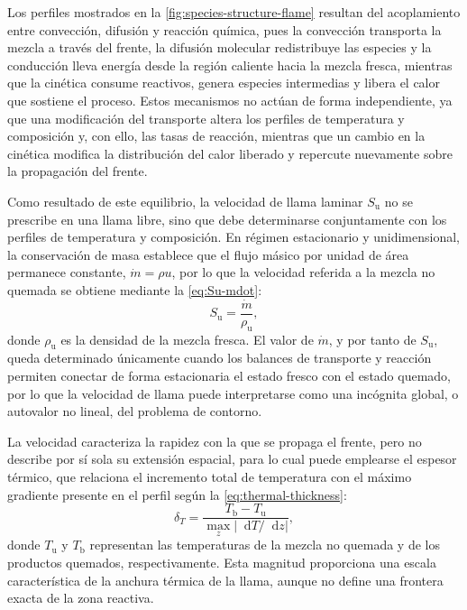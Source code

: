 \documentclass[12pt,a4paper,twoside,openany]{book}
\newcommand{\dd}{\mathop{}\!\mathrm{d}}
\newcommand{\abs}[1]{\left\lvert #1\right\rvert}
\newcommand{\Su}{S_{\mathrm{u}}}
\begin{document}
Los perfiles mostrados en la \cref{fig:species-structure-flame} resultan del
acoplamiento entre convección, difusión y reacción química, pues la convección
transporta la mezcla a través del frente, la difusión molecular redistribuye las
especies y la conducción lleva energía desde la región caliente hacia la mezcla
fresca, mientras que la cinética consume reactivos, genera especies intermedias
y libera el calor que sostiene el proceso. Estos mecanismos no actúan de forma
independiente, ya que una modificación del transporte altera los perfiles de
temperatura y composición y, con ello, las tasas de reacción, mientras que un
cambio en la cinética modifica la distribución del calor liberado y repercute
nuevamente sobre la propagación del frente.

Como resultado de este equilibrio, la velocidad de llama laminar \(\Su\) no se
prescribe en una llama libre, sino que debe determinarse conjuntamente con los
perfiles de temperatura y composición. En régimen estacionario y
unidimensional, la conservación de masa establece que el flujo másico por
unidad de área permanece constante, \(\dot m=\rho u\), por lo que la velocidad
referida a la mezcla no quemada se obtiene mediante la
\cref{eq:Su-mdot}:
\begin{equation}
  \Su=\frac{\dot m}{\rho_{\mathrm u}},
  \label{eq:Su-mdot}
\end{equation}
donde \(\rho_{\mathrm u}\) es la densidad de la mezcla fresca. El valor de
\(\dot m\), y por tanto de \(\Su\), queda determinado únicamente cuando los
balances de transporte y reacción permiten conectar de forma estacionaria el
estado fresco con el estado quemado, por lo que la velocidad de llama puede
interpretarse como una incógnita global, o autovalor no lineal, del problema de
contorno.

La velocidad caracteriza la rapidez con la que se propaga el frente, pero no
describe por sí sola su extensión espacial, para lo cual puede emplearse el
espesor térmico, que relaciona el incremento total de temperatura con el máximo
gradiente presente en el perfil según la
\cref{eq:thermal-thickness}:
\begin{equation}
  \delta_T=
  \frac{T_{\mathrm b}-T_{\mathrm u}}
       {\displaystyle\max_z\abs{\dd T/\dd z}},
  \label{eq:thermal-thickness}
\end{equation}
donde \(T_{\mathrm u}\) y \(T_{\mathrm b}\) representan las temperaturas de la
mezcla no quemada y de los productos quemados, respectivamente. Esta magnitud
proporciona una escala característica de la anchura térmica de la llama, aunque
no define una frontera exacta de la zona reactiva.
\end{document}
